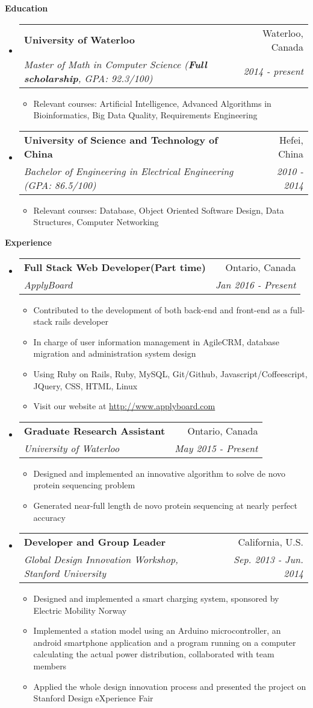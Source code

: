 \documentclass[letterpaper,10pt]{article}
\makeatletter
\newcommand{\resitem}[1]{\item #1 \vspace{-2pt}}
\newcommand{\resheading}[1]{{\large \colorbox{mygrey}{\begin{minipage}{\textwidth}{\textbf{#1 \vphantom{p\^{E}}}}\end{minipage}}}}
\newcommand{\ressubheading}[4]{
\begin{tabular*}{7.0in}{l@{\extracolsep{\fill}}r}
		\textbf{#1} & #2 \\
		\textit{#3} & \textit{#4} \\
\end{tabular*}\vspace{-6pt}}
\makeatother
\begin{document}
\resheading{Education}
\begin{itemize}
\itemsep0em
\item
	\ressubheading{University of Waterloo}{Waterloo, Canada}{Master of Math in Computer Science (\textbf{Full scholarship}, GPA: 92.3/100)}{2014 - present}
	\begin{itemize}
		\resitem{Relevant courses: Artificial Intelligence, Advanced Algorithms in Bioinformatics, Big Data Quality, Requirements Engineering}
	\end{itemize}
\item
	\ressubheading{University of Science and Technology of China}{Hefei, China}{Bachelor of Engineering in Electrical Engineering (GPA: 86.5/100)}{2010 - 2014}
	\begin{itemize}
		\resitem{Relevant courses: Database, Object Oriented Software Design, Data Structures, Computer Networking}
	\end{itemize}

\end{itemize}


\resheading{Experience}
\begin{itemize}
\itemsep0em
\item 
	\ressubheading{Full Stack Web Developer(Part time)}{Ontario, Canada}{ApplyBoard}{Jan 2016 - Present}
	\begin{itemize}
		\resitem{Contributed to the development of both back-end and front-end as a full-stack rails developer}
		\resitem{In charge of user information management in AgileCRM, database migration and administration system design}
		\resitem{Using Ruby on Rails, Ruby, MySQL, Git/Github, Javascript/Coffeescript, JQuery, CSS, HTML, Linux}
	         \resitem{Visit our website at \url{http://www.applyboard.com}}
	\end{itemize}

\item
	\ressubheading{Graduate Research Assistant}{Ontario, Canada}{University of Waterloo}{May 2015 - Present}
	\begin{itemize}
		\resitem{Designed and implemented an innovative algorithm to solve de novo protein sequencing problem }
		\resitem{Generated near-full length de novo protein sequencing at nearly perfect accuracy}
	\end{itemize}
\item
	\ressubheading{Developer and Group Leader}{California, U.S.}{Global Design Innovation Workshop, Stanford University}{ Sep. 2013 - Jun. 2014}
	\begin{itemize}
		\resitem{Designed and implemented a smart charging system, sponsored by Electric Mobility Norway}
		\resitem {Implemented a station model using an Arduino microcontroller, an android smartphone application and a program running on a computer calculating the actual power distribution, collaborated with team members}
		\resitem{Applied the whole design innovation process and presented the project on Stanford Design eXperience Fair}
	\end{itemize}
\end{itemize}
\end{document}

